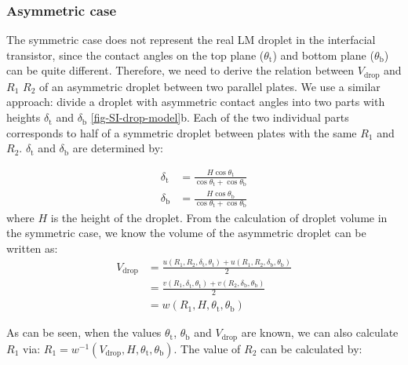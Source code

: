 \subsubsection*{Asymmetric case}
\label{sec:small-orgba3824f}
The symmetric case does not represent the real LM droplet in the
interfacial transistor, since the contact angles on the top plane
(\(\theta_{\mathrm{t}}\)) and bottom plane (\(\theta_{\mathrm{b}}\))
can be quite different. Therefore, we need to derive the relation
between \(V_{\mathrm{drop}}\) and \(R_{1}\) \(R_{2}\) of an asymmetric
droplet between two parallel plates. We use a similar approach:
divide a droplet with asymmetric contact angles into two parts with
heights \(\delta_{\mathrm{t}}\) and \(\delta_{\mathrm{b}}\)
\autoref{fig-SI-drop-model}b. Each of the two individual parts
corresponds to half of a symmetric droplet between plates with the
same \(R_{1}\) and \(R_{2}\). \(\delta_{\mathrm{t}}\) and
\(\delta_{\mathrm{b}}\) are determined by:

\begin{eqnarray}
\label{eq:small-deltas-1}
\delta_{\mathrm{t}} &= {\displaystyle \frac{H \cos \theta_{\mathrm{t}}}{\cos \theta_{\mathrm{t}} 
                  + \cos \theta_{\mathrm{b}}}} \\
\label{eq:small-deltas-2}
\delta_{\mathrm{b}} &= {\displaystyle \frac{H \cos \theta_{\mathrm{b}}}{\cos \theta_{\mathrm{t}} 
                  + \cos \theta_{\mathrm{b}}}}
\end{eqnarray}
where \(H\) is the height of the droplet.
From the calculation of droplet volume in the symmetric case, we know
the volume of the asymmetric droplet can be written as:
\begin{equation}
\label{eq:small-V-assym-1}
\begin{aligned}
V_{\mathrm{drop}} &= \frac{u(R_{1}, R_{2}, \delta_{\mathrm{t}}, \theta_{\mathrm{t}}) + u(R_{1}, R_{2}, \delta_{\mathrm{b}}, \theta_{\mathrm{b}})}{2}\\
                  &= \frac{v(R_{1}, \delta_{\mathrm{t}}, \theta_{\mathrm{t}}) +
                           v(R_{2}, \delta_{\mathrm{b}}, \theta_{\mathrm{b}})}{2} \\
                  &= w(R_{1}, H, \theta_{\mathrm{t}}, \theta_{\mathrm{b}})
\end{aligned}
\end{equation}

As can be seen, when the values \(\theta_{\mathrm{t}}\),
\(\theta_{\mathrm{b}}\) and \(V_{\mathrm{drop}}\) are known, we can also
calculate \(R_{1}\) via: \(R_{1} = w^{-1}(V_{\mathrm{drop}}, H,
 \theta_{\mathrm{t}}, \theta_{\mathrm{b}})\). The value of \(R_{2}\) can
be calculated by:

